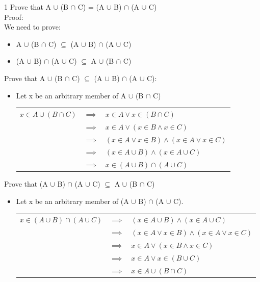 \documentclass[12pt, letterpaper]{article}
\newcommand{\exheader}[1][ex]{{\tiny{#1}\normalsize}}
\begin{document}
\exheader[1] Prove that A $\cup$ (B $\cap$ C) = (A $\cup$ B) $\cap$ (A $\cup$ C) \\ Proof: \\
We need to prove:
\begin{itemize}[leftmargin=*, label={}]
	\item A $\cup$ (B $\cap$ C) $\subseteq$ (A $\cup$ B) $\cap$ (A $\cup$ C)
	\item (A $\cup$ B) $\cap$ (A $\cup$ C) $\subseteq$ A $\cup$ (B $\cap$ C)
\end{itemize}
Prove that A $\cup$ (B $\cap$ C) $\subseteq$ (A $\cup$ B) $\cap$ (A $\cup$ C):
\begin{itemize}[label={}]
	\item Let x be an arbitrary member of A $\cup$ (B $\cap$ C) \\
	\begin{tabular}{l l l}
		$x \in A \cup (B \cap C)$  & $\implies$ & $x \in A \lor x \in (B \cap C)$ \\
		& $\implies$ & $x \in A \lor (x \in B \land x \in C)$ \\
		& $\implies$ & $(x \in A \lor x \in B) \land (x \in A \lor x \in C)$ \\
		& $\implies$ & $(x \in A \cup B) \land (x \in A \cup C)$ \\
		& $\implies$ & $x \in (A \cup B) \cap (A \cup C)$
	\end{tabular}
\end{itemize}
Prove that (A $\cup$ B) $\cap$ (A $\cup$ C) $\subseteq$ A $\cup$ (B $\cap$ C)
\begin{itemize}[label={}]
	\item Let x be an arbitrary member of (A $\cup$ B) $\cap$  (A $\cup$ C). \\
	\begin{tabular}{l l l}
		$x \in (A \cup B) \cap (A \cup C)$ & $\implies $ & $(x \in A \cup B) \land (x \in A \cup C)$ \\
		& $\implies$ & $(x \in A \lor x \in B) \land (x \in A \lor x \in C)$ \\
		& $\implies$ & $x \in A \lor (x \in B \land x \in C)$ \\
		& $\implies$ & $x \in A \lor x \in (B \cup C)$ \\
		& $\implies$ & $x \in A \cup (B \cap C)$
	\end{tabular}
\end{itemize}




\pagebreak
\end{document}

